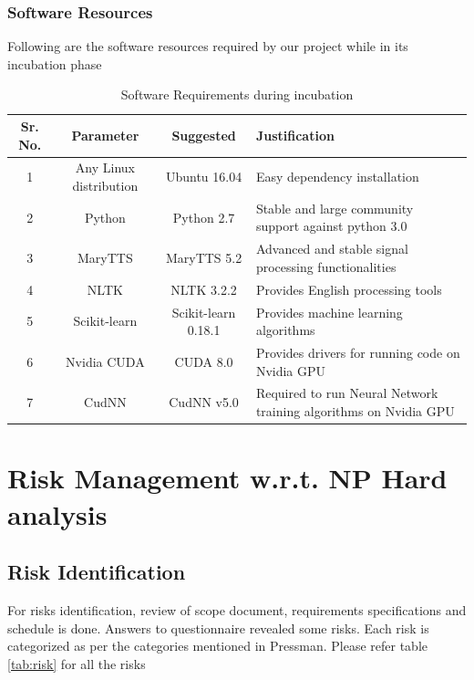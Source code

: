\documentclass[oneside,a4paper,12pt]{book}
\begin{document}
	\subsubsection{Software Resources}
		Following are the software resources required by our project while in its incubation phase
		\begin{table}[!htbp]
			\begin{center}
				\def\arraystretch{1.5}
				\begin{tabularx}{\textwidth}{| c | c | c | X |}
					\hline
					Sr. No. &	Parameter &	Suggested & Justification \\
					\hline
					1 &	Any Linux distribution &	 Ubuntu 16.04  & Easy dependency installation\\
					\hline
					2 &	Python  &	Python 2.7 & Stable and large community support against python 3.0\\
					\hline
					3 & MaryTTS & MaryTTS 5.2 & Advanced and stable signal processing functionalities\\
					\hline
					4 & NLTK & NLTK 3.2.2 & Provides English processing tools\\
					\hline
					5 & Scikit-learn & Scikit-learn 0.18.1 & Provides machine learning algorithms\\
					\hline
					6 & Nvidia CUDA & CUDA 8.0 & Provides drivers for running code on Nvidia GPU\\
					\hline
					7 & CudNN & CudNN v5.0 & Required to run Neural Network training algorithms on Nvidia GPU\\
					\hline
				\end{tabularx}
				\caption { Software Requirements during incubation }
				\label{tab:incubsreq}
			\end{center}
			
		\end{table}
	
\section{Risk Management w.r.t. NP Hard analysis}
\subsection{Risk Identification}
For risks identification, review of scope document, requirements specifications and schedule is done. Answers to questionnaire revealed some risks. Each risk is categorized as per the categories mentioned in Pressman. Please refer table \ref{tab:risk} for all the risks
\end{document}
